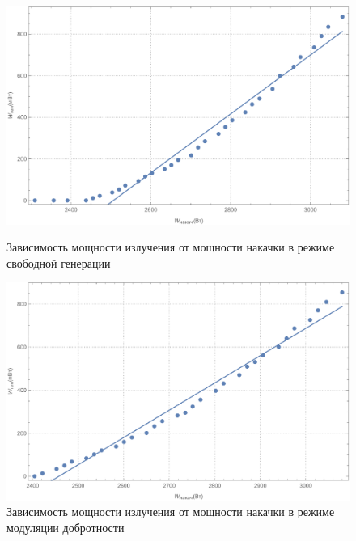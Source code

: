 \documentclass[a4paper, 12pt]{article}
\begin{document}
\begin{figure}[!h]
	\includegraphics[width=\textwidth]{1.pdf}
	\caption{Зависимость мощности излучения от мощности накачки в режиме свободной генерации}
	\endminipage
	\hfill
	\includegraphics[width=\textwidth]{2.pdf}
	\caption{Зависимость мощности излучения от мощности накачки в режиме модуляции добротности}
	\endminipage
\end{figure}
\end{document}
